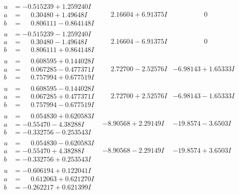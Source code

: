 \documentclass[1p]{elsarticle_modified}
\theoremstyle{definition}
\begin{document}
$$\begin{array}{c|c|c}
\begin{aligned}
u &= -0.515239 + 1.259240 I \\
a &= \phantom{-}0.30480 + 1.49648 I \\
b &= \phantom{-}0.806111 - 0.864148 I\end{aligned}
 & \phantom{-}2.16604 + 6.91375 I & \phantom{-0.000000 } 0 \\ \hline\begin{aligned}
u &= -0.515239 - 1.259240 I \\
a &= \phantom{-}0.30480 - 1.49648 I \\
b &= \phantom{-}0.806111 + 0.864148 I\end{aligned}
 & \phantom{-}2.16604 - 6.91375 I & \phantom{-0.000000 } 0 \\ \hline\begin{aligned}
u &= \phantom{-}0.608595 + 0.144028 I \\
a &= \phantom{-}0.067285 - 0.477371 I \\
b &= \phantom{-}0.757994 + 0.677519 I\end{aligned}
 & \phantom{-}2.72700 - 2.52576 I & -6.98143 + 1.65333 I \\ \hline\begin{aligned}
u &= \phantom{-}0.608595 - 0.144028 I \\
a &= \phantom{-}0.067285 + 0.477371 I \\
b &= \phantom{-}0.757994 - 0.677519 I\end{aligned}
 & \phantom{-}2.72700 + 2.52576 I & -6.98143 - 1.65333 I \\ \hline\begin{aligned}
u &= \phantom{-}0.054830 + 0.620583 I \\
a &= -0.55470 - 4.38288 I \\
b &= -0.332756 - 0.253543 I\end{aligned}
 & -8.90568 + 2.29149 I & -19.8574 - 3.6503 I \\ \hline\begin{aligned}
u &= \phantom{-}0.054830 - 0.620583 I \\
a &= -0.55470 + 4.38288 I \\
b &= -0.332756 + 0.253543 I\end{aligned}
 & -8.90568 - 2.29149 I & -19.8574 + 3.6503 I \\ \hline\begin{aligned}
u &= -0.606194 + 0.122041 I \\
a &= \phantom{-}0.612063 + 0.621270 I \\
b &= -0.262217 + 0.621399 I\end{aligned}

\end{array}$$
\end{document}
